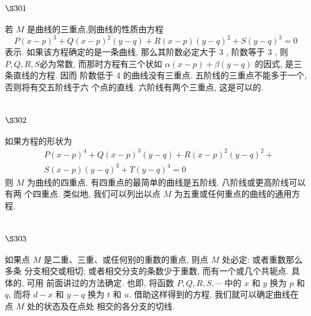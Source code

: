 \section{$\S 301$}

若 $M$ 是曲线的三重点,则曲线的性质由方程
\[
P(x-p)^{3}+Q(x-p)^{2}(y-q)+R(x-p)(y-q)^{2}+S(y-q)^{3}=0
\]
表示. 如果该方程确定的是一条曲线, 那么其阶数必定大于 3 , 阶数等于 3 , 则 $P, Q, R, S$必为常数, 而那时方程有三个状如 $\alpha(x-p)+\beta(y-q)$ 的因式, 是三条直线的方程. 因而 阶数低于 4 的曲线没有三重点. 五阶线的三重点不能多于一个, 否则将有交五阶线于六 个点的直线. 六阶线有两个三重点, 这是可以的.

\section{$\S 302$}

如果方程的形状为
\[
\begin{aligned}
& P(x-p)^{4}+Q(x-p)^{3}(y-q)+R(x-p)^{2}(y-q)^{2}+ \\
& S(x-p)(y-q)^{3}+T(y-q)^{4}=0
\end{aligned}
\]
则 $M$ 为曲线的四重点. 有四重点的最简单的曲线是五阶线. 八阶线或更高阶线可以有两 个四重点. 类似地, 我们可以列出以点 $M$ 为五重或任何重点的曲线的通用方程.

\section{$\S 303$}

如果点 $M$ 是二重、三重、或任何别的重数的重点, 则点 $M$ 处必定: 或者重数那么多条 分支相交或相切; 或者相交分支的条数少于重数, 而有一个或几个共轭点. 具体的, 可用 前面讲过的方法确定. 也即, 将函数 $P, Q, R, S, \cdots$ 中的 $x$ 和 $y$ 换为 $p$ 和 $q$, 而将 $d-x$ 和 $y-q$ 换为 $t$ 和 $u$. 借助这样得到的方程, 我们就可以确定曲线在点 $M$ 处的状态及在点处 相交的各分支的切线. 

